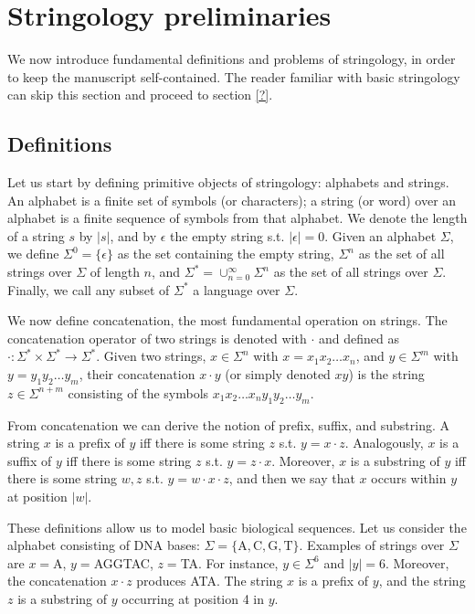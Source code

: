 
\section{Stringology preliminaries}

We now introduce fundamental definitions and problems of stringology, in order to keep the manuscript self-contained.
The reader familiar with basic stringology can skip this section and proceed to section \ref{?}.

\subsection{Definitions}

Let us start by defining primitive objects of stringology: alphabets and strings.
An alphabet is a finite set of symbols (or characters); a string (or word) over an alphabet is a finite sequence of symbols from that alphabet.
We denote the length of a string $s$ by $|s|$, and by $\epsilon$ the empty string s.t. $|\epsilon|=0$.
Given an alphabet $\Sigma$, we define $\Sigma^0=\{ \epsilon \}$ as the set containing the empty string, $\Sigma^n$ as the set of all strings over $\Sigma$ of length $n$, and $\Sigma^* = \cup_{n=0}^{\infty}{\Sigma^n}$ as the set of all strings over $\Sigma$.
Finally, we call any subset of $\Sigma^*$ a language over $\Sigma$.

We now define concatenation, the most fundamental operation on strings.
The concatenation operator of two strings is denoted with $\cdot$ and defined as $\cdot : \Sigma^* \times \Sigma^* \rightarrow \Sigma^*$.
Given two strings, $x \in \Sigma^n$ with $x=x_1 x_2 \dots x_n$, and $y \in \Sigma^m$ with $y=y_1 y_2 \dots y_m$, their concatenation $x \cdot y$ (or simply denoted $xy$) is the string $z \in \Sigma^{n+m}$ consisting of the symbols $x_1 x_2 \dots x_n y_1 y_2 \dots y_m$.

From concatenation we can derive the notion of prefix, suffix, and substring.
A string $x$ is a prefix of $y$ iff there is some string $z$ s.t. $y=x\cdot z$.
Analogously, $x$ is a suffix of $y$ iff there is some string $z$ s.t. $y=z\cdot x$.
Moreover, $x$ is a substring of $y$ iff there is some string $w,z$ s.t. $y=w\cdot x \cdot z$, and then we say that $x$ occurs within $y$ at position $|w|$.

\begin{example}
These definitions allow us to model basic biological sequences.
Let us consider the alphabet consisting of DNA bases: $\Sigma = \{\text{A},\text{C},\text{G},\text{T}\}$.
Examples of strings over $\Sigma$ are $x=$A, $y=$AGGTAC, $z=$TA.
For instance, $y \in \Sigma^6$ and $| y | = 6$.
Moreover, the concatenation $x \cdot z$ produces ATA.
The string $x$ is a prefix of $y$, and the string $z$ is a substring of $y$  occurring at position 4 in $y$.
\end{example}

